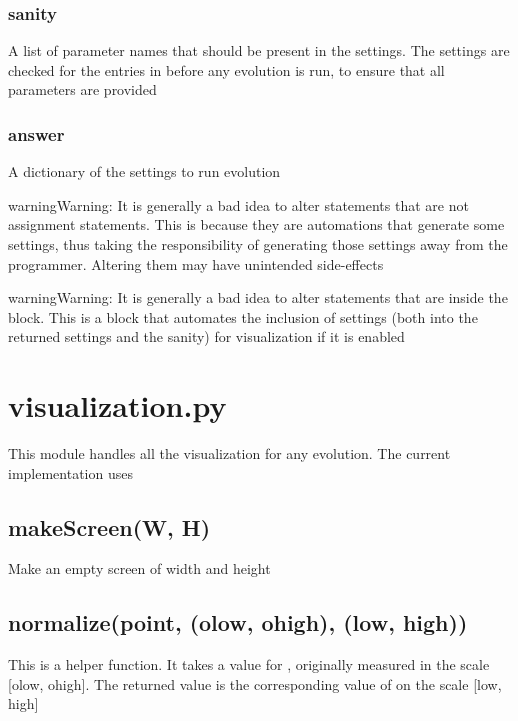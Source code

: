 \documentclass[letterpaper,10pt,english]{sphinxmanual}
\begin{document}
\subsection{sanity}
\label{settings.py:sanity}
A list of parameter names that should be present in the settings.
The settings are checked for the entries in  before any evolution is run, to ensure that all parameters are provided


\subsection{answer}
\label{settings.py:answer}
A dictionary of the settings to run evolution

\begin{notice}{warning}{Warning:}
It is generally a bad idea to alter statements that are not assignment statements. This is because they are automations that generate some settings, thus taking the responsibility of generating those settings away from the programmer. Altering them may have unintended side-effects
\end{notice}

\begin{notice}{warning}{Warning:}
It is generally a bad idea to alter statements that are inside the  block. This is a block that automates the inclusion of settings (both into the returned settings and the sanity) for visualization if it is enabled
\end{notice}


\chapter{visualization.py}
\label{visualization.py:visualization-py}\label{visualization.py::doc}
This module handles all the visualization for any evolution.
The current implementation uses 


\section{makeScreen(W, H)}
\label{visualization.py:makescreen-w-h}
Make an empty screen of width  and height 


\section{normalize(point, (olow, ohigh), (low, high))}
\label{visualization.py:normalize-point-olow-ohigh-low-high}
This is a helper function. It takes a value for , originally measured in the scale {[}olow, ohigh{]}.
The returned value is the corresponding value of  on the scale {[}low, high{]}
\end{document}
